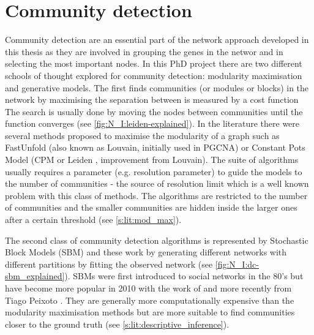 \section{Community detection} \label{s:lit:comm_detect}

\vspace{3mm}
\vspace{3mm}

Community detection are an essential part of the network approach developed in this thesis as they are involved in grouping the genes in the networ and in selecting the most important nodes. In this PhD project there are two different schools of thought explored for community detection: modularity maximisation and generative models. The first finds communities (or modules or blocks) in the network by maximising the separation between is measured by a cost function The search is usually done by moving the nodes between communities until the function converges (see \cref{fig:N_I:leiden-explained}). In the literature there were several methods proposed to maximise the modularity of a graph such as FastUnfold \citep{Blondel2008-ik} (also known as Louvain, initially used in PGCNA) or Constant Pots Model (CPM or Leiden \citet{Traag2019-ne}, improvement from Louvain). The suite of algorithms usually requires a parameter (e.g. resolution parameter) to guide the models to the number of communities - the source of resolution limit which is a well known problem with this class of methods. The algorithms are restricted to the number of communities and the smaller communities are hidden inside the larger ones after a certain threshold (see \cref{s:lit:mod_max}).

The second class of community detection algorithms is represented by Stochastic Block Models (SBM) and these work by generating different networks with different partitions by fitting the observed network (see \cref{fig:N_I:dc-sbm_explained}). SBMs were first introduced to social networks \citep{Holland1983-eu} in the 80's but have become more popular in 2010 with the work of \citet{Karrer2011-si} and more recently from Tiago Peixoto \citep{Peixoto2014-ls,Peixoto2017-ua,Peixoto2018-ot,Peixoto2019-fg,Peixoto2023-mw,Peixoto2024-mu}. They are generally more computationally expensive than the modularity maximisation methods but are more suitable to find communities closer to the ground truth (see \cref{s:lit:descriptive_inference}).

